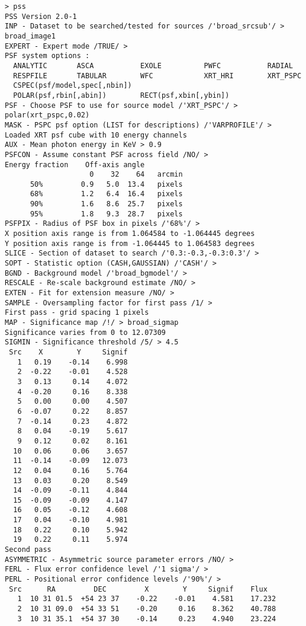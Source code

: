 \begin{verbatim}
> pss
PSS Version 2.0-1
INP - Dataset to be searched/tested for sources /'broad_srcsub'/ > broad_image1
EXPERT - Expert mode /TRUE/ > 
PSF system options :
  ANALYTIC       ASCA           EXOLE          PWFC           RADIAL
  RESPFILE       TABULAR        WFC            XRT_HRI        XRT_PSPC
  CSPEC(psf/model,spec[,nbin])
  POLAR(psf,rbin[,abin])        RECT(psf,xbin[,ybin])
PSF - Choose PSF to use for source model /'XRT_PSPC'/ > polar(xrt_pspc,0.02)
MASK - PSPC psf option (LIST for descriptions) /'VARPROFILE'/ > 
Loaded XRT psf cube with 10 energy channels
AUX - Mean photon energy in KeV > 0.9
PSFCON - Assume constant PSF across field /NO/ > 
Energy fraction    Off-axis angle
                    0    32    64   arcmin
      50%         0.9   5.0  13.4   pixels
      68%         1.2   6.4  16.4   pixels
      90%         1.6   8.6  25.7   pixels
      95%         1.8   9.3  28.7   pixels
PSFPIX - Radius of PSF box in pixels /'68%'/ > 
X position axis range is from 1.064584 to -1.064445 degrees
Y position axis range is from -1.064445 to 1.064583 degrees
SLICE - Section of dataset to search /'0.3:-0.3,-0.3:0.3'/ > 
SOPT - Statistic option (CASH,GAUSSIAN) /'CASH'/ > 
BGND - Background model /'broad_bgmodel'/ > 
RESCALE - Re-scale background estimate /NO/ > 
EXTEN - Fit for extension measure /NO/ > 
SAMPLE - Oversampling factor for first pass /1/ > 
First pass - grid spacing 1 pixels
MAP - Significance map /!/ > broad_sigmap
Significance varies from 0 to 12.07309
SIGMIN - Significance threshold /5/ > 4.5
 Src    X        Y     Signif
   1   0.19    -0.14    6.998
   2  -0.22    -0.01    4.528
   3   0.13     0.14    4.072
   4  -0.20     0.16    8.338
   5   0.00     0.00    4.507
   6  -0.07     0.22    8.857
   7  -0.14     0.23    4.872
   8   0.04    -0.19    5.617
   9   0.12     0.02    8.161
  10   0.06     0.06    3.657
  11  -0.14    -0.09   12.073
  12   0.04     0.16    5.764
  13   0.03     0.20    8.549
  14  -0.09    -0.11    4.844
  15  -0.09    -0.09    4.147
  16   0.05    -0.12    4.608
  17   0.04    -0.10    4.981
  18   0.22     0.10    5.942
  19   0.22     0.11    5.974
Second pass
ASYMMETRIC - Asymmetric source parameter errors /NO/ > 
FERL - Flux error confidence level /'1 sigma'/ > 
PERL - Positional error confidence levels /'90%'/ > 
 Src      RA         DEC         X        Y     Signif    Flux
   1  10 31 01.5  +54 23 37    -0.22    -0.01    4.581    17.232
   2  10 31 09.0  +54 33 51    -0.20     0.16    8.362    40.788
   3  10 31 35.1  +54 37 30    -0.14     0.23    4.940    23.224

\end{verbatim}
